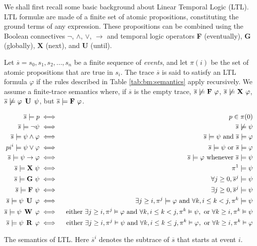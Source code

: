We shall first recall some basic background about Linear Temporal Logic (LTL). LTL formul\ae{} are made of a finite set of atomic propositions, constituting the ground terms of any expression. These propositions can be combined using the Boolean connectives $\neg$, $\wedge$, $\vee$, $\rightarrow$ and temporal logic operators \textbf{F} (eventually), \textbf{G} (globally), \textbf{X} (next), and \textbf{U} (until).

Let $\overline{s} = s_0, s_1, s_2, ..., s_n$ be a finite sequence of \emph{events}, and let $\pi(i)$ be the set of atomic propositions that are true in $s_i$. The trace $\overline{s}$ is said to satisfy an LTL formula $\varphi$ if the rules described in Table \ref{tab:bm:semantics} apply recursively. We assume a finite-trace semantics where, if $\overline{s}$ is the empty trace,  $\overline{s} \not\models \mathop{\mbox{\textbf{F}}}\, \varphi$, $\overline{s} \not\models \mathop{\mbox{\textbf{X}}}\, \varphi$, $\overline{s} \not\models \varphi \mathrel{\mbox{\,\textbf{U}}}\, \psi$, but $\overline{s} \models \mathop{\mbox{\textbf{F}}}\, \varphi$.

\begin{table}
\begin{eqnarray*}
\overline{s} \models p & \iff &  p \in \pi(0)\\
\overline{s} \models \neg\psi & \iff &  \overline{s} \not\models \psi\\
\overline{s} \models \psi \wedge \varphi & \iff &  \overline{s} \models \psi \mbox{ and }\overline{s} \models \varphi\\
pi^i \models \psi \vee \varphi & \iff &  \overline{s} \models \psi\mbox{ or }\overline{s} \models \varphi\\
\overline{s} \models \psi \rightarrow \varphi & \iff &  \overline{s} \models \varphi \mbox{ whenever }\overline{s} \models \psi\\
\overline{s} \models \mathop{\mbox{\textbf{X}}}\,\psi & \iff &  \pi^{1} \models \psi\\
\overline{s} \models \mathop{\mbox{\textbf{G}}}\,\psi & \iff &  \forall j \geq 0, \overline{s}^j \models \psi\\
\overline{s} \models \mathop{\mbox{\textbf{F}}}\,\psi & \iff &  \exists j \geq 0, \overline{s}^j \models \psi\\
\overline{s} \models \psi \mathrel{\mbox{\,\textbf{U}}}\, \varphi & \iff &  \exists j \geq i, \pi^j \models \varphi \mbox{ and }\forall k, i \leq k < j, \pi^k \models \psi\\
\overline{s} \models \psi \mathrel{\mbox{\,\textbf{W}}}\, \varphi & \iff & \mbox{ either } \exists j \geq i, \pi^j \vDash \varphi \mbox{ and } \forall k, i \leq k < j, \pi^k \vDash \psi, \mbox{ or } \forall k \geq i, \pi^k \vDash \psi \\
\overline{s} \models \psi \mathrel{\mbox{\,\textbf{R}}}\, \varphi & \iff & \mbox{ either } \exists j \geq i, \pi^j \vDash \psi \mbox{ and } \forall k, i \leq k \leq j, \pi^k \vDash \varphi, \mbox{ or } \forall k \geq i, \pi^k \vDash \varphi
\\
\end{eqnarray*}
\caption{The semantics of LTL. Here $\overline{s}^i$ denotes the subtrace of $\overline{s}$ that starts at event $i$.}
\label{tab:bm:semantics}
\end{table}

